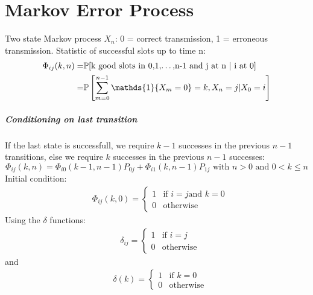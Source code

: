 \chapter{Markov Error Process}
Two state Markov process $X_n$: 0 = correct transmission, 1 = erroneous transmission. Statistic of successful slots up to time n:
\begin{equation}
	\begin{split}
			\Phi_{ij}(k,n) = & \prob[\textrm{k good slots in 0,1,$\dots$,n-1 and j at n | i at 0}] \\
										 = & \prob\left[\sum\limits_{m=0}^{n-1} \mathds{1}\{X_m = 0\} = k, X_n = j | X_0 = i\right]
	\end{split}
\end{equation}
\paragraph{Conditioning on last transition}
If the last state is successfull, we require $k-1$ successes in the previous $n-1$ transitions, else we require $k$ successes in the previous $n-1$ successes:
$$\Phi_{ij}(k,n) = \Phi_{i0}(k-1,n-1)P_{0j} + \Phi_{i1}(k,n-1)P_{1j} \textrm{ with } n>0 \textrm{ and } 0<k\leq n$$
Initial condition:
\begin{equation}
 \begin{split}
	 &\Phi_{ij}(k,0)=
	 \begin{cases}
		 1 &  \text{if } i = j \text{and } k = 0 \\
		 0 &  \text{otherwise}
	 \end{cases}
 \end{split}
\end{equation}
Using the $\delta$ functions:
\begin{equation*}
 \begin{split}
	 &\delta_{ij}=
	 \begin{cases}
		 1 &  \text{if } i = j \\
		 0 &  \text{otherwise}
	 \end{cases}
 \end{split}
\end{equation*}
and
\begin{equation*}
 \begin{split}
	 &\delta(k)=
	 \begin{cases}
		 1 &  \text{if } k = 0 \\
		 0 &  \text{otherwise}
	 \end{cases}
 \end{split}
\end{equation*}
